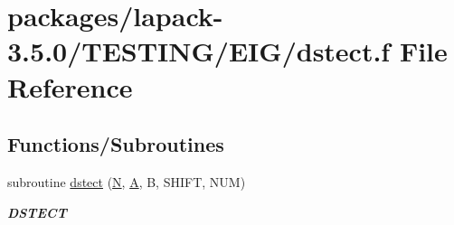 \hypertarget{dstect_8f}{}\section{packages/lapack-\/3.5.0/\+T\+E\+S\+T\+I\+N\+G/\+E\+I\+G/dstect.f File Reference}
\label{dstect_8f}
\subsection*{Functions/\+Subroutines}
\begin{DoxyCompactItemize}
\item 
subroutine \hyperlink{group__double__eig_ga5467550660ec78049bd9d095d06fc25e}{dstect} (\hyperlink{polmisc_8c_a0240ac851181b84ac374872dc5434ee4}{N}, \hyperlink{classA}{A}, B, S\+H\+I\+F\+T, N\+U\+M)
\begin{DoxyCompactList}\small\item\em {\bfseries D\+S\+T\+E\+C\+T} \end{DoxyCompactList}\end{DoxyCompactItemize}
